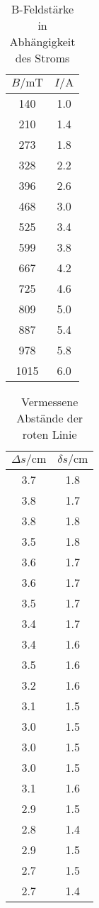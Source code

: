 \begin{table}
    \centering
    \caption{B-Feldstärke in Abhängigkeit des Stroms}
    \label{tab:eichung}
    \begin{tabular}{cc}
        \toprule
        $B/\si{\milli\tesla} $ & $I/\si{\ampere}$\\
        \midrule
        140     &1.0\\
        210     &1.4\\
        273     &1.8\\
        328     &2.2\\
        396     &2.6\\
        468     &3.0\\
        525     &3.4\\
        599     &3.8\\
        667     &4.2\\
        725     &4.6\\
        809     &5.0\\
        887     &5.4\\
        978     &5.8\\
        1015    &6.0\\
        \bottomrule
    \end{tabular}
\end{table}

\begin{table}
    \centering
    \caption{Vermessene Abstände der roten Linie}
    \label{tab:rote_Linie}
    \begin{tabular}{cc}
        \toprule
        $\Delta s/\si{\centi\meter}$ & $\delta s/\si{\centi\meter}$\\
        \midrule
        3.7 &1.8\\
        3.8 &1.7\\
        3.8 &1.8\\
        3.5 &1.8\\
        3.6 &1.7\\
        3.6 &1.7\\
        3.5 &1.7\\
        3.4 &1.7\\
        3.4 &1.6\\
        3.5 &1.6\\
        3.2 &1.6\\
        3.1 &1.5\\
        3.0 &1.5\\
        3.0 &1.5\\
        3.0 &1.5\\
        3.1 &1.6\\
        2.9 &1.5\\
        2.8 &1.4\\
        2.9 &1.5\\
        2.7 &1.5\\
        2.7 &1.4\\
        \bottomrule
    \end{tabular}
\end{table}

